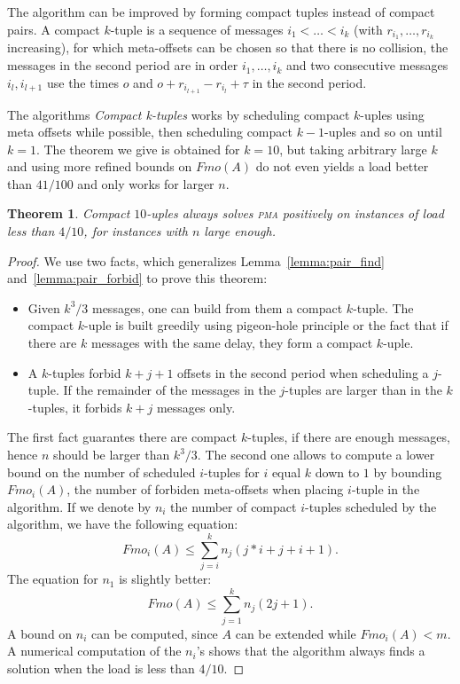 \documentclass[10pt, conference, letterpaper]{IEEEtran}
\newtheorem{theorem}{Theorem}
\newcommand\pma{\textsc{pma}\xspace}
\begin{document}
The algorithm can be improved by forming compact tuples instead of compact pairs.
A compact $k$-tuple is a sequence of messages $i_1 < \dots < i_k$ (with $r_{i_1},\dots,r_{i_k}$ increasing), for which meta-offsets can be chosen so that there is no collision,
the messages in the second period are in order $i_1,\dots,i_k$ and two consecutive messages $i_{l},i_{l+1}$ use the times $o$ and $o + r_{i_{l+1}} -r_{i_{l}} + \tau$ in the second period.




The algorithms \emph{Compact k-tuples} works by scheduling compact $k$-uples
using meta offsets while possible, then scheduling compact $k-1$-uples and so on until $k=1$.
The theorem we give is obtained for $k=10$, but taking arbitrary large $k$ and using more refined bounds on $Fmo(A)$ do not even yields a load better than $41/100$ and only works for larger $n$.


\begin{theorem}
Compact $10$-uples always solves \pma positively on instances of load less than $4/10$, for instances with $n$ large enough.
\end{theorem}
\begin{proof}
We use two facts, which generalizes Lemma~\ref{lemma:pair_find} and~\ref{lemma:pair_forbid} to prove this theorem:
\begin{itemize}
\item Given $ k^3/3$ messages, one can build from them a compact $k$-tuple. 
The compact $k$-uple is built greedily using pigeon-hole principle or the fact that if there are $k$ messages with the same delay, they form a compact $k$-uple.
\item A $k$-tuples forbid $k+j+1$ offsets in the second period when scheduling a 
$j$-tuple. If the remainder of the messages in the $j$-tuples are larger than in the $k$-tuples, it forbids $k+j$ messages only.
\end{itemize}

The first fact guarantes there are compact $k$-tuples, if there are enough messages,
hence $n$ should be larger than $k^3/3$.
The second one allows to compute a lower bound on the number of scheduled $i$-tuples for $i$ equal $k$ down to $1$ by bounding $Fmo_i(A)$, the number of forbiden meta-offsets when placing $i$-tuple in the algorithm.
If we denote by $n_i$ the number of compact $i$-tuples scheduled by the algorithm,
we have the following equation:  $$ Fmo_i(A) \leq \displaystyle{\sum_{j=i}^k n_j(j*i + j + i+ 1)}.$$
The equation for $n_1$ is slightly better: 
$$ Fmo(A) \leq \displaystyle{\sum_{j=1}^k n_j(2j + 1)}.$$
A bound on $n_i$ can be computed, since $A$ can be extended while $Fmo_i(A) < m$. A numerical computation of the $n_i$'s shows that the algorithm always finds a solution when the load is less than $4/10$.
\end{proof}
\end{document}
